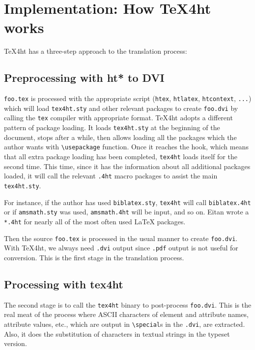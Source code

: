 % 

\chapter{Implementation: How \TeX{}4ht works}

\TeX{}4ht has a three-step approach to the translation process:

\section{Preprocessing with ht* to DVI}

\Verb=foo.tex= is processed with the appropriate script (\Verb=htex=,
\Verb=htlatex=, \Verb=htcontext=, \Verb=...=) which will load
\Verb=tex4ht.sty= and other relevant packages to create \Verb=foo.dvi=
by calling the \Verb=tex= compiler with appropriate format. \TeX{}4ht
adopts a different pattern of package loading. It loads
\Verb=tex4ht.sty= at the beginning of the document, stops after a
while, then allows loading all the packages which the author wants
with \Verb=\usepackage= function.  Once it reaches the
\Verb== hook, which means that all extra package
loading has been completed, \Verb=tex4ht= loads itself for the second
time. This time, since it has the information about all additional
packages loaded, it will call the relevant \Verb=.4ht= macro packages
to assist the main \Verb=tex4ht.sty=.

For instance, if the author has used \Verb=biblatex.sty=,
\Verb=tex4ht= will call \Verb=biblatex.4ht= or if \Verb=amsmath.sty=
was used, \Verb=amsmath.4ht= will be input, and so on.  Eitan wrote a
\Verb=*.4ht= for nearly all of the most often used \LaTeX{}
packages.

Then the source \Verb=foo.tex= is processed in the usual manner to
create \Verb=foo.dvi=.  With \TeX{}4ht, we always need \Verb=.dvi=
output since \Verb=.pdf= output is not useful for conversion. This is
the first stage in the translation process.


\section{Processing with tex4ht}

The second stage is to call the \Verb=tex4ht= binary to post-process
\Verb=foo.dvi=. This is the real meat of the process where ASCII
characters of element and attribute names, attribute values, etc.,
which are output in \Verb=\special=s in the \Verb=.dvi=, are
extracted. Also, it does the substitution of characters in textual
strings in the typeset version.

